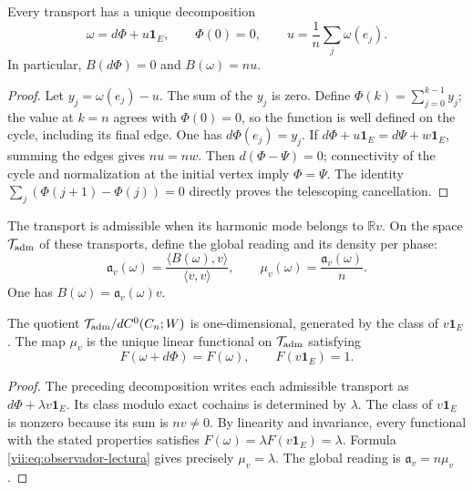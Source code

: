 \begin{theorem}
\label{vii:thm:observador-descomposicion}
Every transport has a unique decomposition
\[
 \omega=d\Phi+u\mathbf1_E,\qquad \Phi(0)=0,
 \qquad u=\frac1n\sum_j\omega(e_j).
\]
In particular, \(B(d\Phi)=0\) and \(B(\omega)=nu\).
\end{theorem}

\begin{proof}
Let \(y_j=\omega(e_j)-u\). The sum of the \(y_j\) is zero.
Define \(\Phi(k)=\sum_{j=0}^{k-1}y_j\); the value at \(k=n\)
agrees with \(\Phi(0)=0\), so the function is well defined
on the cycle, including its final edge. One has \(d\Phi(e_j)=y_j\).
If \(d\Phi+u\mathbf1_E=d\Psi+w\mathbf1_E\), summing the edges gives
\(nu=nw\). Then \(d(\Phi-\Psi)=0\); connectivity of the cycle
and normalization at the initial vertex imply \(\Phi=\Psi\).
The identity \(\sum_j(\Phi(j+1)-\Phi(j))=0\) directly proves
the telescoping cancellation.
\end{proof}

\begin{definition}
\label{vii:def:observador-admisible}
The transport is admissible when its harmonic mode belongs to
\(\mathbb Rv\). On the space \(\mathcal T_{\rm adm}\) of these
transports, define the global reading and its density per phase:
\begin{equation}
 \mathfrak a_v(\omega)
 =\frac{\langle B(\omega),v\rangle}{\langle v,v\rangle},
 \qquad
 \mu_v(\omega)=\frac{\mathfrak a_v(\omega)}n.
 \label{vii:eq:observador-lectura}
\end{equation}
One has \(B(\omega)=\mathfrak a_v(\omega)v\).
\end{definition}

\begin{theorem}
\label{vii:thm:observador-unicidad}
The quotient
\(\mathcal T_{\rm adm}/dC^0(C_n;W)\) is one-dimensional, generated
by the class of \(v\mathbf1_E\). The map \(\mu_v\) is the
unique linear functional on \(\mathcal T_{\rm adm}\) satisfying
\[
 F(\omega+d\Phi)=F(\omega),\qquad F(v\mathbf1_E)=1.
\]
\end{theorem}

\begin{proof}
The preceding decomposition writes each admissible transport as
\(d\Phi+\lambda v\mathbf1_E\). Its class modulo exact cochains
is determined by \(\lambda\). The class of \(v\mathbf1_E\)
is nonzero because its sum is \(nv\neq0\). By linearity and
invariance, every functional with the stated properties satisfies
\(F(\omega)=\lambda F(v\mathbf1_E)=\lambda\). Formula
\eqref{vii:eq:observador-lectura} gives precisely \(\mu_v=\lambda\).
The global reading is \(\mathfrak a_v=n\mu_v\).
\end{proof}

